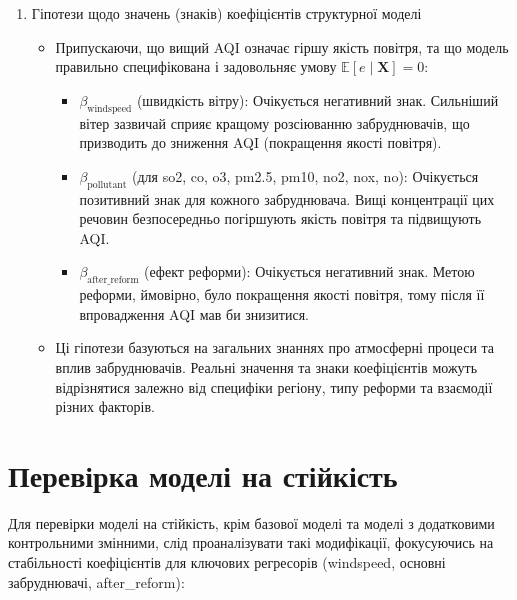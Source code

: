 \documentclass{article}
\begin{document}
\begin{enumerate}
    \item Гіпотези щодо значень (знаків) коефіцієнтів структурної моделі
    \begin{itemize}
        \item Припускаючи, що вищий AQI означає гіршу якість повітря, та що модель правильно специфікована і задовольняє умову $\mathbb{E}[e \mid \mathbf{X}] = 0$:
        \begin{itemize}
            \item $\beta_{\text{windspeed}}$ (швидкість вітру): Очікується негативний знак. Сильніший вітер зазвичай сприяє кращому розсіюванню забруднювачів, що призводить до зниження AQI (покращення якості повітря).
            \item $\beta_{\text{pollutant}}$ (для so2, co, o3, pm2.5, pm10, no2, nox, no): Очікується позитивний знак для кожного забруднювача. Вищі концентрації цих речовин безпосередньо погіршують якість повітря та підвищують AQI.
            \item $\beta_{\text{after\_reform}}$ (ефект реформи): Очікується негативний знак. Метою реформи, ймовірно, було покращення якості повітря, тому після її впровадження AQI мав би знизитися.
        \end{itemize}
        \item Ці гіпотези базуються на загальних знаннях про атмосферні процеси та вплив забруднювачів. Реальні значення та знаки коефіцієнтів можуть відрізнятися залежно від специфіки регіону, типу реформи та взаємодії різних факторів.
    \end{itemize}
\end{enumerate}

\section{Перевірка моделі на стійкість}
Для перевірки моделі на стійкість, крім базової моделі та моделі з додатковими контрольними змінними, слід проаналізувати такі модифікації, фокусуючись на стабільності коефіцієнтів для ключових регресорів (windspeed, основні забруднювачі, after\_reform):
\end{document}
